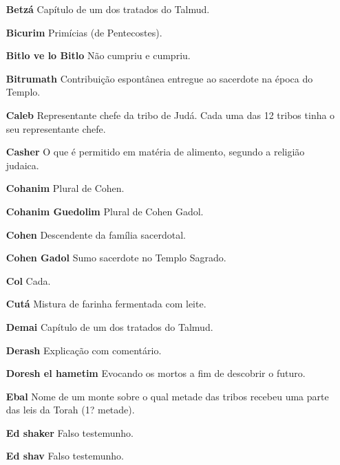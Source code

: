 \begin{itemize}
\item[\textbf{Betzá}] Capítulo de um dos tratados do Talmud.

\item[\textbf{Bicurim}] Primícias (de Pentecostes).

\item[\textbf{Bitlo ve lo Bitlo}] Não cumpriu e cumpriu.

\item[\textbf{Bitrumath}]Contribuição espontânea entregue ao sacerdote na época do
Templo.

\item[\textbf{Caleb}] Representante chefe da tribo de Judá. Cada uma das 12
tribos tinha o seu representante chefe.

\item[\textbf{Casher}] O que é permitido em matéria de alimento, segundo a
religião judaica.

\item[\textbf{Cohanim}] Plural de Cohen.

\item[\textbf{Cohanim Guedolim}] Plural de Co­hen Gadol.

\item[\textbf{Cohen}] Descendente da família sacer­dotal.

\item[\textbf{Cohen Gadol}] Sumo sacerdote no Templo Sagrado.

\item[\textbf{Col}] Cada.

\item[\textbf{Cutá}] Mistura de farinha fermentada com leite.

\item[\textbf{Demai}] Capítulo de um dos tratados do Talmud.

\item[\textbf{Derash}] Explicação com comentário.

\item[\textbf{Doresh el hametim}] Evocando os mortos a fim de descobrir o futuro.

\item[\textbf{Ebal}] Nome de um monte sobre o qual metade das tribos recebeu uma parte das leis da
Torah (1? metade).

\item[\textbf{Ed shaker}] Falso testemunho.

\item[\textbf{Ed shav}] Falso testemunho.


\end{itemize}
